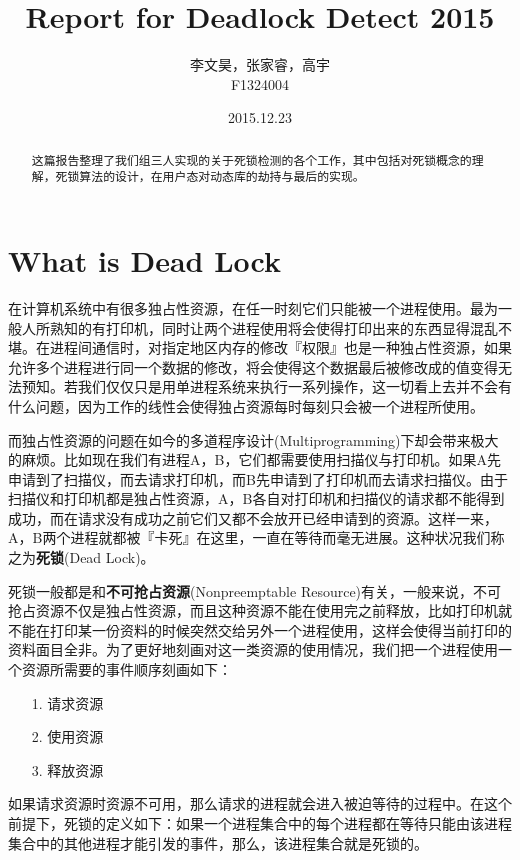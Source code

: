\documentclass[titlepage]{article}
\begin{document}
\title{Report for Deadlock Detect 2015}
\author{李文昊，张家睿，高宇\\F1324004}
\date{2015.12.23}
\maketitle

\kaishu

\begin{abstract}
\quad \quad 这篇报告整理了我们组三人实现的关于死锁检测的各个工作，其中包括对死锁概念的理解，死锁算法的设计，在用户态对动态库的劫持与最后的实现。
\end{abstract}

\tableofcontents
\newpage

\section{What is Dead Lock}
\indent 在计算机系统中有很多独占性资源，在任一时刻它们只能被一个进程使用。最为一般人所熟知的有打印机，同时让两个进程使用将会使得打印出来的东西显得混乱不堪。在进程间通信时，对指定地区内存的修改『权限』也是一种独占性资源，如果允许多个进程进行同一个数据的修改，将会使得这个数据最后被修改成的值变得无法预知。若我们仅仅只是用单进程系统来执行一系列操作，这一切看上去并不会有什么问题，因为工作的线性会使得独占资源每时每刻只会被一个进程所使用。

\indent 而独占性资源的问题在如今的多道程序设计(Multiprogramming)下却会带来极大的麻烦。比如现在我们有进程A，B，它们都需要使用扫描仪与打印机。如果A先申请到了扫描仪，而去请求打印机，而B先申请到了打印机而去请求扫描仪。由于扫描仪和打印机都是独占性资源，A，B各自对打印机和扫描仪的请求都不能得到成功，而在请求没有成功之前它们又都不会放开已经申请到的资源。这样一来，A，B两个进程就都被『卡死』在这里，一直在等待而毫无进展。这种状况我们称之为\textbf{死锁}(Dead Lock)。

\indent 死锁一般都是和\textbf{不可抢占资源}(Nonpreemptable Resource)有关，一般来说，不可抢占资源不仅是独占性资源，而且这种资源不能在使用完之前释放，比如打印机就不能在打印某一份资料的时候突然交给另外一个进程使用，这样会使得当前打印的资料面目全非。为了更好地刻画对这一类资源的使用情况，我们把一个进程使用一个资源所需要的事件顺序刻画如下：
\begin{itemize}
	\item[1.] 请求资源
	\item[2.] 使用资源
	\item[3.] 释放资源
\end{itemize}
\indent  如果请求资源时资源不可用，那么请求的进程就会进入被迫等待的过程中。在这个前提下，死锁的定义如下：如果一个进程集合中的每个进程都在等待只能由该进程集合中的其他进程才能引发的事件，那么，该进程集合就是死锁的。
\end{document}
